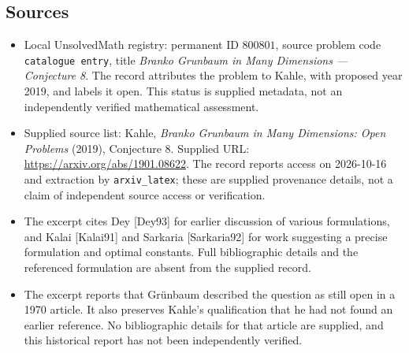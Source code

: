 \documentclass[11pt]{article}
\begin{document}
\subsection{Sources}
\begin{itemize}
\item Local UnsolvedMath registry: permanent ID \(800801\), source problem code \texttt{catalogue entry}, title \emph{Branko Grunbaum in Many Dimensions --- Conjecture 8}. The record attributes the problem to Kahle, with proposed year 2019, and labels it open. This status is supplied metadata, not an independently verified mathematical assessment.
\item Supplied source list: Kahle, \emph{Branko Grunbaum in Many Dimensions: Open Problems} (2019), Conjecture 8. Supplied URL: \url{https://arxiv.org/abs/1901.08622}. The record reports access on 2026-10-16 and extraction by \texttt{arxiv\_latex}; these are supplied provenance details, not a claim of independent source access or verification.
\item The excerpt cites Dey [Dey93] for earlier discussion of various formulations, and Kalai [Kalai91] and Sarkaria [Sarkaria92] for work suggesting a precise formulation and optimal constants. Full bibliographic details and the referenced formulation are absent from the supplied record.
\item The excerpt reports that Gr\"unbaum described the question as still open in a 1970 article. It also preserves Kahle's qualification that he had not found an earlier reference. No bibliographic details for that article are supplied, and this historical report has not been independently verified.
\end{itemize}
\end{document}
